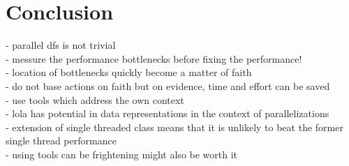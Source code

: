 \chapter{Conclusion}


- parallel dfs is not trivial\\
- messure the performance bottlenecks before fixing the performance!\\
- location of bottlenecks quickly become a matter of faith \\
- do not base actions on faith but on evidence, time and effort can be saved\\
- use tools which address the own context\\
- lola has potential in data representations in the context of parallelizations\\

- extension of single threaded class means that it is unlikely to beat the former single thread performance\\

- using tools can be frightening might also be worth it 